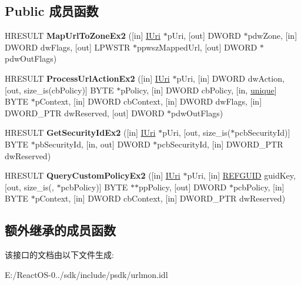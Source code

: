 \subsection*{Public 成员函数}
\begin{DoxyCompactItemize}
\item 
\mbox{\label{interface_i_internet_security_manager_ex2_addceafd615d361604eb502146979c705}} 
H\+R\+E\+S\+U\+LT {\bfseries Map\+Url\+To\+Zone\+Ex2} (\mbox{[}in\mbox{]} \hyperlink{interface_i_uri}{I\+Uri} $\ast$p\+Uri, \mbox{[}out\mbox{]} D\+W\+O\+RD $\ast$pdw\+Zone, \mbox{[}in\mbox{]} D\+W\+O\+RD dw\+Flags, \mbox{[}out\mbox{]} L\+P\+W\+S\+TR $\ast$ppwsz\+Mapped\+Url, \mbox{[}out\mbox{]} D\+W\+O\+RD $\ast$pdw\+Out\+Flags)
\item 
\mbox{\label{interface_i_internet_security_manager_ex2_ac0210f0990bd7acc18adcf976e81518f}} 
H\+R\+E\+S\+U\+LT {\bfseries Process\+Url\+Action\+Ex2} (\mbox{[}in\mbox{]} \hyperlink{interface_i_uri}{I\+Uri} $\ast$p\+Uri, \mbox{[}in\mbox{]} D\+W\+O\+RD dw\+Action, \mbox{[}out, size\+\_\+is(cb\+Policy)\mbox{]} B\+Y\+TE $\ast$p\+Policy, \mbox{[}in\mbox{]} D\+W\+O\+RD cb\+Policy, \mbox{[}in, \hyperlink{interfaceunique}{unique}\mbox{]} B\+Y\+TE $\ast$p\+Context, \mbox{[}in\mbox{]} D\+W\+O\+RD cb\+Context, \mbox{[}in\mbox{]} D\+W\+O\+RD dw\+Flags, \mbox{[}in\mbox{]} D\+W\+O\+R\+D\+\_\+\+P\+TR dw\+Reserved, \mbox{[}out\mbox{]} D\+W\+O\+RD $\ast$pdw\+Out\+Flags)
\item 
\mbox{\label{interface_i_internet_security_manager_ex2_a43424b540e26e63b68d38a6a1afd31c5}} 
H\+R\+E\+S\+U\+LT {\bfseries Get\+Security\+Id\+Ex2} (\mbox{[}in\mbox{]} \hyperlink{interface_i_uri}{I\+Uri} $\ast$p\+Uri, \mbox{[}out, size\+\_\+is($\ast$pcb\+Security\+Id)\mbox{]} B\+Y\+TE $\ast$pb\+Security\+Id, \mbox{[}in, out\mbox{]} D\+W\+O\+RD $\ast$pcb\+Security\+Id, \mbox{[}in\mbox{]} D\+W\+O\+R\+D\+\_\+\+P\+TR dw\+Reserved)
\item 
\mbox{\label{interface_i_internet_security_manager_ex2_a95e8db25f384d660b25f2f343481b55b}} 
H\+R\+E\+S\+U\+LT {\bfseries Query\+Custom\+Policy\+Ex2} (\mbox{[}in\mbox{]} \hyperlink{interface_i_uri}{I\+Uri} $\ast$p\+Uri, \mbox{[}in\mbox{]} \hyperlink{struct___g_u_i_d}{R\+E\+F\+G\+U\+ID} guid\+Key, \mbox{[}out, size\+\_\+is(, $\ast$pcb\+Policy)\mbox{]} B\+Y\+TE $\ast$$\ast$pp\+Policy, \mbox{[}out\mbox{]} D\+W\+O\+RD $\ast$pcb\+Policy, \mbox{[}in\mbox{]} B\+Y\+TE $\ast$p\+Context, \mbox{[}in\mbox{]} D\+W\+O\+RD cb\+Context, \mbox{[}in\mbox{]} D\+W\+O\+R\+D\+\_\+\+P\+TR dw\+Reserved)
\end{DoxyCompactItemize}
\subsection*{额外继承的成员函数}


该接口的文档由以下文件生成\+:\begin{DoxyCompactItemize}
\item 
E\+:/\+React\+O\+S-\/0../sdk/include/psdk/urlmon.\+idl\end{DoxyCompactItemize}
